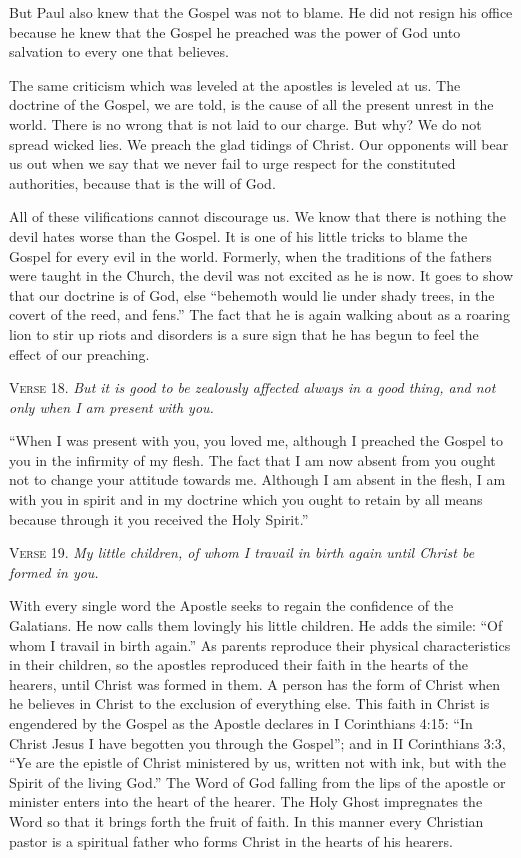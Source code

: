But Paul also knew that the Gospel was not to blame. He did not resign his office because he knew that the Gospel he preached was the power of God unto salvation to every one that believes.

The same criticism which was leveled at the apostles is leveled at us. The doctrine of the Gospel, we are told, is the cause of all the present unrest in the world. There is no wrong that is not laid to our charge. But why? We do not spread wicked lies. We preach the glad tidings of Christ. Our opponents will bear us out when we say that we never fail to urge respect for the constituted authorities, because that is the will of God.

All of these vilifications cannot discourage us. We know that there is nothing the devil hates worse than the Gospel. It is one of his little tricks to blame the Gospel for every evil in the world. Formerly, when the traditions of the fathers were taught in the Church, the devil was not excited as he is now. It goes to show that our doctrine is of God, else “behemoth would lie under shady trees, in the covert of the reed, and fens.” The fact that he is again walking about as a roaring lion to stir up riots and disorders is a sure sign that he has begun to feel the effect of our preaching.

\textsc{Verse} 18. \emph{But it is good to be zealously affected always in a good thing, and not only when I am present with you.}

“When I was present with you, you loved me, although I preached the Gospel to you in the infirmity of my flesh. The fact that I am now absent from you ought not to change your attitude towards me. Although I am absent in the flesh, I am with you in spirit and in my doctrine which you ought to retain by all means because through it you received the Holy Spirit.”

\textsc{Verse} 19. \emph{My little children, of whom I travail in birth again until Christ be formed in you.}

With every single word the Apostle seeks to regain the confidence of the Galatians. He now calls them lovingly his little children. He adds the simile: “Of whom I travail in birth again.” As parents reproduce their physical characteristics in their children, so the apostles reproduced their faith in the hearts of the hearers, until Christ was formed in them. A person has the form of Christ when he believes in Christ to the exclusion of everything else. This faith in Christ is engendered by the Gospel as the Apostle declares in I Corinthians 4:15: “In Christ Jesus I have begotten you through the Gospel”; and in II Corinthians 3:3, “Ye are the epistle of Christ ministered by us, written not with ink, but with the Spirit of the living God.” The Word of God falling from the lips of the apostle or minister enters into the heart of the hearer. The Holy Ghost impregnates the Word so that it brings forth the fruit of faith. In this manner every Christian pastor is a spiritual father who forms Christ in the hearts of his hearers.

